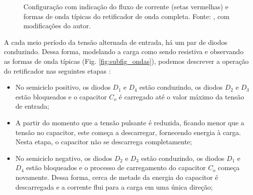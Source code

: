 \begin{figure}[H]
\centering
{}
\qquad
{}
\caption{Configuração com indicação do fluxo de corrente (setas vermelhas) e formas de onda típicas do retificador de onda completa. Fonte: , com modificações do autor.}
\label{fig:globfig}
\end{figure}

A cada meio período da tensão alternada de entrada, há um par de diodos conduzindo. Dessa forma, modelando a carga como sendo resistiva e observando as formas de onda típicas (Fig. \ref{fig:subfig_ondas}), podemos descrever a operação do retificador nas seguintes etapas \cite{retificador}:

\begin{itemize}
    \item  No semiciclo positivo, os diodos $D_{1}$ e $D_{4}$ estão conduzindo, os diodos $D_{2}$ e $D_{3}$ estão bloqueados e o capacitor $C_{o}$ é carregado até o valor máximo da tensão de entrada;
    
    \item A partir do momento que a tensão pulsante é reduzida, ficando menor que a tensão no capacitor, este começa a descarregar, fornecendo energia à carga. Nesta etapa, o capacitor não se descarrega completamente;
    
    \item No semiciclo negativo, os diodos $D_{2}$ e $D_{3}$ estão conduzindo, os diodos $D_{1}$ e $D_{4}$ estão bloqueados e o processo de carregamento do capacitor $C_{o}$ começa novamente. Dessa forma, cerca de metade da energia do capacitor é descarregada e a corrente flui para a carga em uma única direção;
    
\end{itemize}

